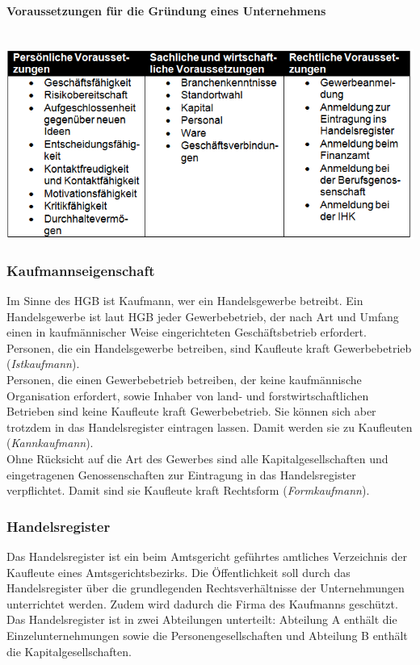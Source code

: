 \paragraph{Voraussetzungen für die Gründung eines Unternehmens} ~\\
\includegraphics[scale=0.9]{pictures/lf01-pic/lf01-existenzgruendung.png}\\

\subsubsection{Kaufmannseigenschaft}
Im Sinne des HGB ist Kaufmann, wer ein Handelsgewerbe betreibt. Ein Handelsgewerbe ist laut HGB jeder Gewerbebetrieb, der nach Art und Umfang einen in kaufmännischer Weise eingerichteten Geschäftsbetrieb erfordert.\\
Personen, die ein Handelsgewerbe betreiben, sind Kaufleute kraft Gewerbebetrieb ({\it Istkaufmann}).\\
Personen, die einen Gewerbebetrieb betreiben, der keine kaufmännische Organisation erfordert, sowie Inhaber von land- und forstwirtschaftlichen Betrieben sind keine Kaufleute kraft Gewerbebetrieb. Sie können sich aber trotzdem in das Handelsregister eintragen lassen. Damit werden sie zu Kaufleuten ({\it Kannkaufmann}).\\
Ohne Rücksicht auf die Art des Gewerbes sind alle Kapitalgesellschaften und eingetragenen Genossenschaften zur Eintragung in das Handelsregister verpflichtet. Damit sind sie Kaufleute kraft Rechtsform ({\it Formkaufmann}).

\subsubsection{Handelsregister}
Das Handelsregister ist ein beim Amtsgericht geführtes amtliches Verzeichnis der Kaufleute eines Amtsgerichtsbezirks. Die Öffentlichkeit soll durch das Handelsregister über die grundlegenden Rechtsverhältnisse der Unternehmungen unterrichtet werden. Zudem wird dadurch die Firma des Kaufmanns geschützt.\\
Das Handelsregister ist in zwei Abteilungen unterteilt: Abteilung A enthält die Einzelunternehmungen sowie die Personengesellschaften und Abteilung B enthält die Kapitalgesellschaften.\\

